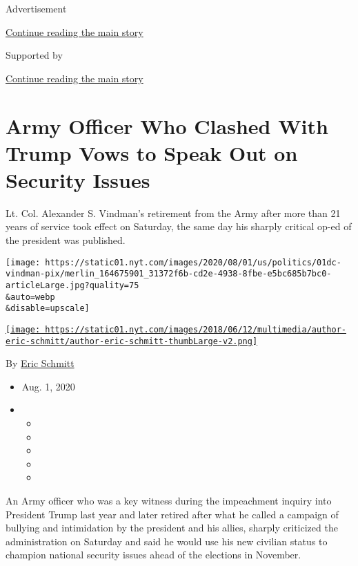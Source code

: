 Advertisement

\protect\hyperlink{after-top}{Continue reading the main story}

Supported by

\protect\hyperlink{after-sponsor}{Continue reading the main story}

\hypertarget{army-officer-who-clashed-with-trump-vows-to-speak-out-on-security-issues}{%
\section{Army Officer Who Clashed With Trump Vows to Speak Out on
Security
Issues}\label{army-officer-who-clashed-with-trump-vows-to-speak-out-on-security-issues}}

Lt. Col. Alexander S. Vindman's retirement from the Army after more than
21 years of service took effect on Saturday, the same day his sharply
critical op-ed of the president was published.

\texttt{[image: https://static01.nyt.com/images/2020/08/01/us/politics/01dc-vindman-pix/merlin\_164675901\_31372f6b-cd2e-4938-8fbe-e5bc685b7bc0-articleLarge.jpg?quality=75\\\&auto=webp\\\&disable=upscale]}

\href{https://www.nytimes.com/by/eric-schmitt}{\texttt{[image: https://static01.nyt.com/images/2018/06/12/multimedia/author-eric-schmitt/author-eric-schmitt-thumbLarge-v2.png]}}

By \href{https://www.nytimes.com/by/eric-schmitt}{Eric Schmitt}

\begin{itemize}
\item
  Aug. 1, 2020
\item
  \begin{itemize}
  \item
  \item
  \item
  \item
  \item
  \end{itemize}
\end{itemize}

An Army officer who was a key witness during the impeachment inquiry
into President Trump last year and later retired after what he called a
campaign of bullying and intimidation by the president and his allies,
sharply criticized the administration on Saturday and said he would use
his new civilian status to champion national security issues ahead of
the elections in November.

